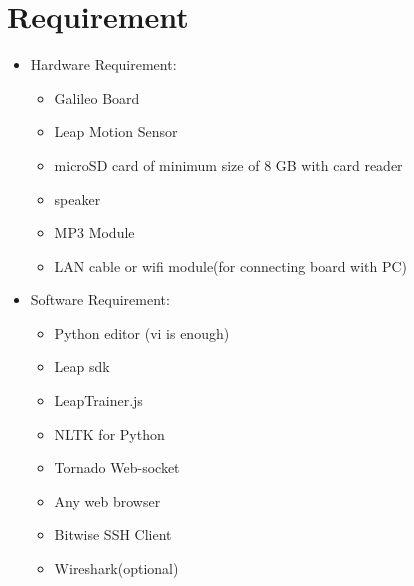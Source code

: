 \documentclass[11pt,a4paper]{article}
\begin{document}
	\section{\textbf{\Huge{Requirement}}}
	\vspace{1cm}
	\begin{itemize}
	    \item Hardware Requirement:
	    \begin{itemize}
	        \item Galileo Board
	        \item Leap Motion Sensor
	        \item microSD card of minimum size of 8 GB with card reader
	        \item speaker
	        \item MP3 Module
	        \item LAN cable or wifi module(for connecting board with PC)
	    \end{itemize}
	    \vspace{1cm}
	    \item Software Requirement:
	    \begin{itemize}
	        \item Python editor (vi is enough)
	        \item Leap sdk
	        \item LeapTrainer.js
	        \item NLTK for Python
	        \item Tornado Web-socket
	        \item Any web browser
	        \item Bitwise SSH Client
	        \item Wireshark(optional)
	    \end{itemize}
	\end{itemize}
	\newpage
\end{document}
